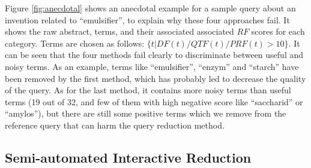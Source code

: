 \vspace*{0.5mm}
Figure \ref{fig:anecdotal} shows an anecdotal example for a sample query about an invention related to ``emulsifier'', to explain why these four approaches fail. It shows the raw abstract, terms, and their associated associated $\mathit{RF}$ scores for each category. Terms are chosen as follows: $\{t| DF(t)/QTF(t)/PRF(t)>10\} $. It can be seen that the four methods fail clearly to discriminate between useful and noisy terms. As an example, terms like ``emulsifier'', ``enzym'' and ``starch'' have been removed by the first method, which has probably led to decrease the quality of the query. As for the last method, it contains more noisy terms than useful terms (19 out of 32, and few of them with high negative score like ``saccharid'' or ``amylos''), but there are still some positive terms which we remove from the reference query that can harm the query reduction method.
 


\subsection{Semi-automated Interactive Reduction}

\label{sec:SemiAutomatedInteractiveReduction}

